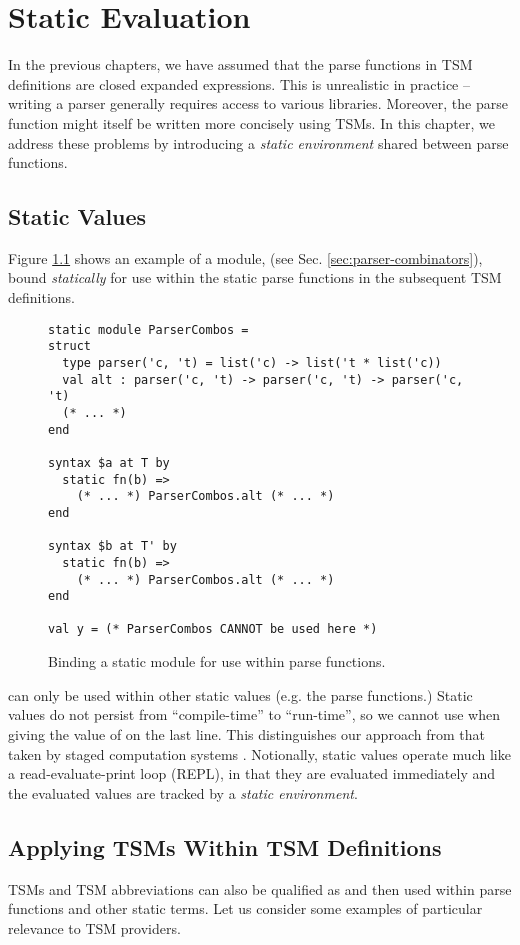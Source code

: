 \chapter{Static Evaluation}\label{chap:static-eval}
In the previous chapters, we have assumed that the parse functions in TSM definitions are closed expanded expressions. This is unrealistic in practice -- writing a parser generally requires access to various libraries. Moreover, the parse function might itself be written more concisely using TSMs. In this chapter, we address these problems by introducing a \emph{static environment} shared between parse functions.

\section{Static Values}
Figure \ref{fig:static-module-example} shows an example of a module,  (see Sec. \ref{sec:parser-combinators}), bound \emph{statically} for use within the static parse functions in the subsequent TSM definitions.
\begin{figure}[h]
\begin{lstlisting}
static module ParserCombos = 
struct 
  type parser('c, 't) = list('c) -> list('t * list('c))
  val alt : parser('c, 't) -> parser('c, 't) -> parser('c, 't)
  (* ... *)
end

syntax $a at T by 
  static fn(b) => 
  	(* ... *) ParserCombos.alt (* ... *)
end

syntax $b at T' by 
  static fn(b) => 
    (* ... *) ParserCombos.alt (* ... *)
end

val y = (* ParserCombos CANNOT be used here *)
\end{lstlisting}
\caption{Binding a static module for use within parse functions.}
\label{fig:static-module-example}
\end{figure}
\clearpage

 can only be used within other static values (e.g. the parse functions.) Static values do not persist from ``compile-time'' to ``run-time'', so we cannot use  when giving the value of  on the last line. This distinguishes our approach from that taken by staged computation systems \cite{Taha99multi-stageprogramming:}. Notionally, static values operate much like a read-evaluate-print loop (REPL), in that they are evaluated immediately and the evaluated values are tracked by a \emph{static environment}.


\section{Applying TSMs Within TSM Definitions}\label{sec:tsms-for-tsms}
TSMs and TSM abbreviations can also be qualified as  and then used within parse functions and other static terms. Let us consider some examples of particular relevance to TSM providers.

